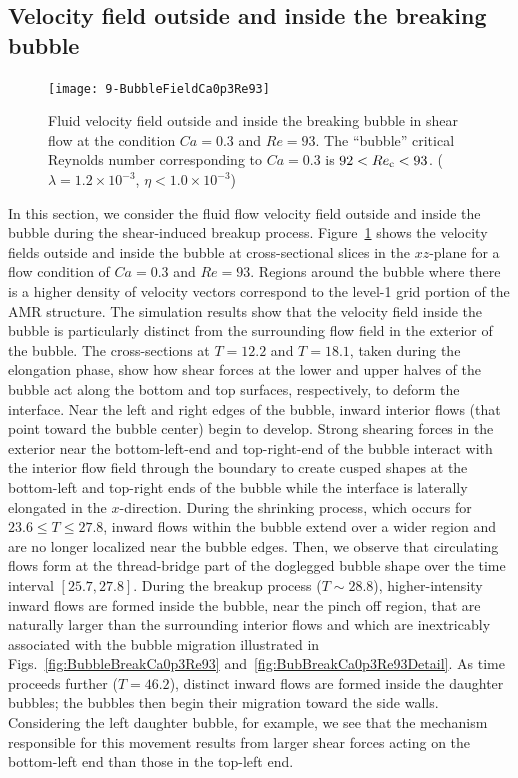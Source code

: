 \documentclass[review]{elsarticle}
\begin{document}
\subsection{Velocity field outside and inside the breaking bubble}
%
\begin{figure}%
  \centering
  \texttt{[image: 9-BubbleFieldCa0p3Re93]}
  \caption{Fluid velocity field outside and inside the breaking bubble in
           shear flow at the condition $Ca=0.3$ and $Re=93$.
	   The ``bubble'' 
	   critical Reynolds number corresponding to $Ca=0.3$ is
	   $92<Re_{\rm c}<93$.
           ($\lambda = 1.2 \times 10^{-3}$, $\eta < 1.0 \times 10^{-3}$) 
	   }
  \label{fig:BubbleFieldCa0p3Re93}
\end{figure}
%
In this section, we consider the fluid flow velocity field outside and inside
the bubble during the shear-induced breakup process.
Figure~\ref{fig:BubbleFieldCa0p3Re93} shows the velocity fields outside and
inside the bubble at cross-sectional slices in the $xz$-plane for a flow
condition of $Ca = 0.3$ and $Re = 93$.  Regions around the bubble where there
is a higher density of velocity vectors correspond to the level-1 grid portion
of the AMR structure.  The simulation results show that the velocity field
inside the bubble is particularly distinct from the surrounding flow field in
the exterior of the bubble.  The cross-sections at $T=12.2$ and $T=18.1$, taken
during the elongation phase, show how shear forces at the lower and upper
halves of the bubble act along the bottom and top surfaces, respectively, to
deform the interface.  Near the left and right edges of the bubble, inward
interior flows (that point toward the bubble center) begin to develop.  Strong
shearing forces in the exterior near the bottom-left-end and top-right-end of
the bubble interact with the interior flow field through the boundary to create
cusped shapes at the bottom-left and top-right ends of the bubble while the
interface is laterally elongated in the $x$-direction.  During the shrinking
process, which occurs for $23.6 \leq T \leq 27.8$, inward flows within the
bubble extend over a wider region and are no longer localized near the bubble
edges.  Then, we observe that circulating flows form at the thread-bridge part
of the doglegged bubble shape over the time interval $[25.7, 27.8]$.  During
the breakup process ($T \sim 28.8$), higher-intensity inward flows are formed
inside the bubble, near the pinch off region, that are naturally larger than
the surrounding interior flows and which are inextricably associated with the
bubble migration illustrated in Figs.~\ref{fig:BubbleBreakCa0p3Re93}
and~\ref{fig:BubBreakCa0p3Re93Detail}.  As time proceeds further ($T =  46.2$),
distinct inward flows are formed inside the daughter bubbles; the bubbles then
begin their migration toward the side walls.  Considering the left daughter
bubble, for example, we see that the mechanism responsible for this movement
results from larger shear forces acting on the bottom-left end than those in
the top-left end.
\end{document}

